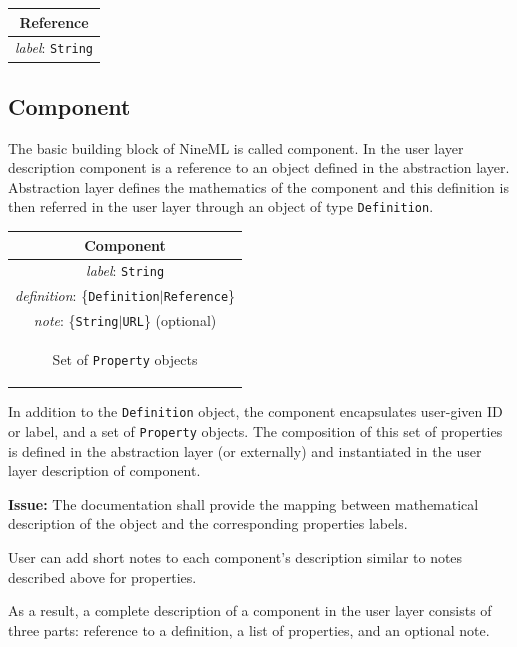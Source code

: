 \documentclass{article}
\newcommand{\issue}[1]{%
\begin{center}
\colorbox{issuecolor}{\parbox{0.8\linewidth}{\textbf{Issue:} #1}}
\end{center}%
}
\begin{document}
\begin{table}[htb]
\center
\begin{tabular}{|c|}
\hline
\hline
Reference \\
\hline
\hline
{\em label}: {\tt String} \\
\hline
\end{tabular}
\end{table}

\subsection{Component}

The basic building block of NineML is called component. In the user layer
description component is a reference to an object defined in the abstraction
layer. Abstraction layer defines the mathematics of the component and this
definition is then referred in the user layer through an object of type
{\tt Definition}.

\begin{table}[htb]
\center
\begin{tabular}{|c|}
\hline
\hline
Component \\
\hline
\hline
{\em label}: {\tt String} \\
\hline
{\em definition}: \{{\tt Definition}$|${\tt Reference}\}\\
\hline
{\em note}: \{{\tt String}$|${\tt URL}\} (optional)\\
\hline
\colorbox{issuecolor}{\parbox{0.4\linewidth}
{\center Set of {\tt Property} objects}} \\
\hline
\end{tabular}
\end{table}

In addition to the {\tt Definition} object, the component encapsulates
user-given ID or label, and a set of {\tt Property} objects. The composition
of this set of properties is defined in the abstraction layer (or externally)
and instantiated in the user layer description of component.

\issue{The documentation shall provide the mapping between mathematical
description of the object and the corresponding properties labels.}

User can add short notes to each component's description similar to
notes described above for properties.

As a result, a complete description of a component in the user layer consists
of three parts: reference to a definition, a list of properties, and an
optional note.
\end{document}

